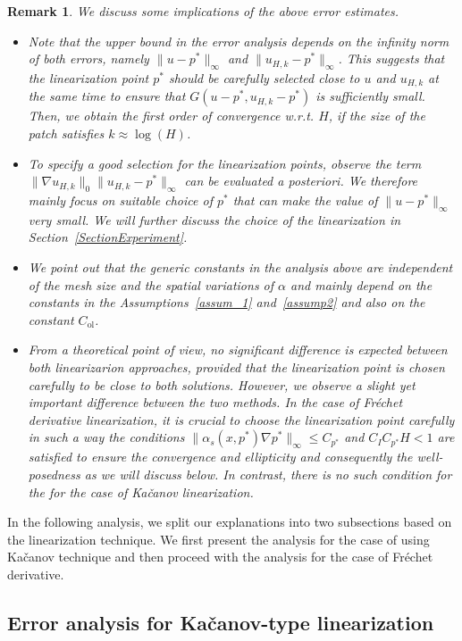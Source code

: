 \documentclass{article}
\newtheorem{remark}[theorem]{Remark}
\begin{document}
   \begin{remark} We discuss some implications of the above error estimates.
  \begin{itemize}
      \item Note that the upper bound in the error analysis depends on the infinity norm of both errors, namely $\|u-p^*\|_\infty$ and $\|u_{H,k}-p^*\|_\infty$. This suggests that the linearization point $p^*$ should be carefully selected close to $u$ and $u_{H,k}$ at the same time to ensure that $G(u-p^*,u_{H,k}-p^*)$ is sufficiently small. Then, we obtain the first order of convergence w.r.t. $H$, if the size of the patch satisfies $k \approx \operatorname{log}(H)$.
      \item To specify a good selection for the linearization points, observe the term $\|\nabla u_{H,k}\|_0\|u_{H,k}-p^*\|_\infty$ can be evaluated a posteriori. We therefore mainly focus on suitable choice of $p^*$ that can make the value of $\|u-p^*\|_\infty$ very small. We will further discuss the choice of the linearization in Section~\ref{SectionExperiment}.
      \item We point out that the generic constants in the analysis above are independent of the mesh size and the spatial variations of $\alpha$ and mainly depend on the constants in the Assumptions~\ref{assum_1} and~\ref{assump2} and also on the constant ${C_\mathrm{ol}}$.
      \item From a theoretical point of view, no significant difference is expected between both linearizarion approaches, provided that the linearization point is chosen carefully to be close to both solutions. However, we observe a slight yet important difference between the two methods. In the case of Fréchet derivative linearization, it is crucial to choose the linearization point carefully in such a way the conditions $\|\alpha_s(x,p^*)\nabla p^*\|_\infty \leq C_{p^*}$ and $C_IC_{p^*}H<1$ are satisfied to ensure the convergence and ellipticity and consequently the well-posedness as we will discuss below. In contrast, there is no such condition for the for the case of Kačanov linearization. 
  \end{itemize}
\end{remark}
In the following analysis, we split our explanations into two subsections based on the linearization technique. We first present the analysis for the case of using Kačanov technique and then proceed with the analysis for the case of Fréchet derivative. 

\subsection{Error analysis for Kačanov-type linearization}
\end{document}
